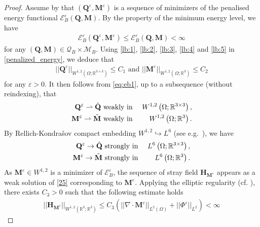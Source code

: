 \documentclass{article}
\def\Qvec{\mathbf{Q}}
\def \Mvec{\mathbf{M}}
\def\Hvec{\mathbf{H}}
\begin{document}
\begin{proof}
Assume by  that $\left(\Qvec^{\varepsilon}, \Mvec^{\varepsilon}\right)$ is a sequence of minimizers of the penalised energy functional $\mathcal{E}^{\varepsilon}_B\left(\Qvec, \Mvec\right)$. By the property of the minimum energy level, we have
\begin{eqnarray}
\mathcal{E}^{\varepsilon}_B\left(\Qvec^{\varepsilon}, \Mvec^{\varepsilon}\right)\le \mathcal{E}^{\varepsilon}_B\left(\Qvec, \Mvec\right)<\infty
\end{eqnarray}
for any $\left(\Qvec, \Mvec\right)\in\mathcal{Q}_B\times\mathcal{M}_B$. Using \eqref{lb:1}, \eqref{lb:2}, \eqref{lb:3}, \eqref{lb:4} and \eqref{lb:5} in \eqref{penalized_energy}, we deduce that
\begin{eqnarray}
||\Qvec^{\varepsilon}||_{W^{1,2}\left(\Omega; \mathbb R^{3\times 3}\right)}\le C_1 \mbox{ and } ||\Mvec^{\varepsilon}||_{W^{1,2}\left(\Omega; \mathbb R^3\right)}\le C_2\label{eq:eb1}
\end{eqnarray}
for any $\varepsilon>0$.
It then follows from \eqref{eq:eb1}, up to a subsequence (without reindexing), that 
\begin{eqnarray}
\Qvec^{\varepsilon}\rightharpoonup\Tilde{\Qvec} &\mbox{ weakly in }& W^{1,2}\left(\Omega; \mathbb R^{3\times 3}\right),\label{eq:eb2}\\
\Mvec^{\varepsilon}\rightharpoonup\Tilde{\Mvec} &\mbox{ weakly in }& W^{1,2}\left(\Omega; \mathbb R^{3}\right)\label{eq:eb3}.
\end{eqnarray}
By Rellich-Kondra\v{s}ov compact embedding $W^{1,2}\hookrightarrow L^6$ (see e.g.\ \cite{ciarlet2021mathematical}), we have
\begin{eqnarray}
\Qvec^{\varepsilon}\rightarrow\Tilde{\Qvec} &\mbox{ strongly in }& L^{6}\left(\Omega; \mathbb R^{3\times 3}\right)\label{eq:eb4},\\
\Mvec^{\varepsilon}\rightarrow\Tilde{\Mvec} &\mbox{ strongly in }& L^{6}\left(\Omega; \mathbb R^{3}\right)\label{eq:eb5}.
\end{eqnarray}
As $\Mvec^{\varepsilon}\in W^{1,2}$ is a minimizer of $\mathcal{E}^{\varepsilon}_B$, the sequence of stray field $\Hvec_{\Mvec^{\varepsilon}}$ appears as a weak solution of \eqref{25} corresponding to $\Mvec^{\varepsilon}$. Applying the elliptic regularity (cf. \cite{gilbarg1998elliptic}), there exists $C_3>0$ such that the following estimate holds
\begin{eqnarray}
||\Hvec_{\Mvec^{\varepsilon}}||_{W^{1,2}\left(\mathbb R^3; \mathbb R^3\right)}\le C_3\left(||\nabla\cdot\Mvec^{\varepsilon}||_{L^2\left(\Omega\right)}+||\Phi^{\varepsilon}||_{L^2}\right)<\infty

\end{eqnarray}
\end{proof}
\end{document}
